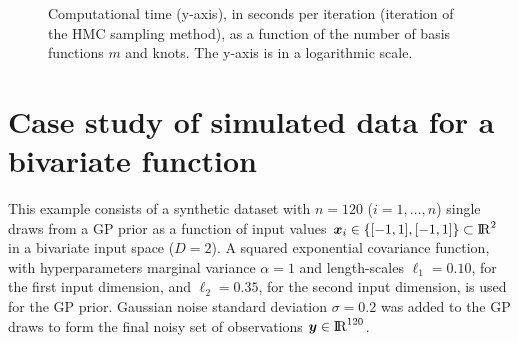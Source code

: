 \documentclass[onecolumn,a4paper,11pt]{article}
\begin{document}
\begin{figure}
\centering
{}
\caption{Computational time (y-axis), in seconds per iteration (iteration of the HMC sampling method), as a function of the number of basis functions $m$ and knots. The y-axis is in a logarithmic scale.}
  \label{ch5_fig14_1_time_gaydata}
\end{figure}


\section{Case study of simulated data for a bivariate function}

This example consists of a synthetic dataset with $n=120$ ($i=1,\dots,n$) single draws from a GP prior as a function of input values $\bm{x}_i \in \{[-1,1],[-1,1]\} \subset {\rm I\!R}^2$ in a bivariate input space ($D=2$). A squared exponential covariance function, with hyperparameters marginal variance $\alpha=1$ and length-scales $\ell_1=0.10$, for the first input dimension, and $\ell_2=0.35$, for the second input dimension, is used for the GP prior. Gaussian noise standard deviation $\sigma=0.2$ was added to the GP draws to form the final noisy set of observations $\bm{y} \in {\rm I\!R}^{120}$.
\end{document}
